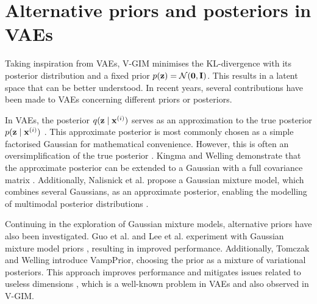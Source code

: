 \section{Alternative priors and posteriors in VAEs}
	Taking inspiration from VAEs, V-GIM minimises the KL-divergence with its posterior distribution and a fixed prior $p(\mathbf{z})=\mathcal{N}(\bm{\mathbf{0}}, \mathbf{I})$. This results in a latent space that can be better understood. In recent years, several contributions have been made to VAEs concerning different priors or posteriors.
	
	In VAEs, the posterior $q (\mathbf{z} \mid \mathbf{x}^{(i)})$ serves as an approximation to the true posterior $p (\mathbf{z} \mid \mathbf{x}^{(i)})$ \cite{odaiboTutorialDerivingStandard2019}. This approximate posterior is most commonly chosen as a simple factorised Gaussian for mathematical convenience. However, this is often an oversimplification of the true posterior \cite{nalisnickApproximateInferenceDeep}. Kingma and Welling demonstrate that the approximate posterior can be extended to a Gaussian with a full covariance matrix \cite{kingmaIntroductionVariationalAutoencoders2019}. Additionally, Nalisnick et al. propose a Gaussian mixture model, which combines several Gaussians, as an approximate posterior, enabling the modelling of multimodal posterior distributions \cite{nalisnickApproximateInferenceDeep}.
	
	Continuing in the exploration of Gaussian mixture models, alternative priors have also been investigated. Guo et al. and Lee et al. experiment with Gaussian mixture model priors \cite{guoVariationalAutoencoderOptimizing2020, leeMetaGMVAEMixtureGaussian2021}, resulting in improved performance. Additionally, Tomczak and Welling introduce VampPrior, choosing the prior as a mixture of variational posteriors. This approach improves performance and mitigates issues related to useless dimensions \cite{tomczakVAEVampPrior2018}, which is a well-known problem in VAEs and also observed in V-GIM.
	












